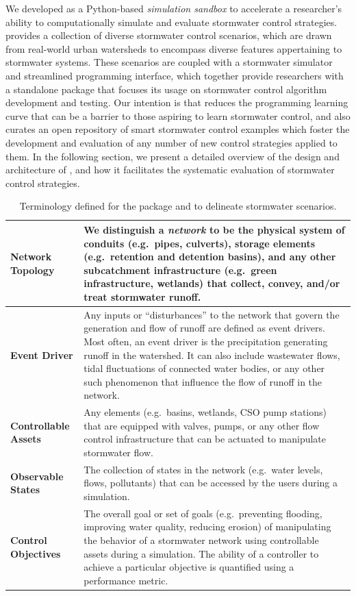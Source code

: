 We developed \pystorms as a Python-based \emph{simulation sandbox} to accelerate a researcher's ability to computationally simulate and evaluate stormwater control strategies. \pystorms provides a collection of diverse stormwater control scenarios, which are drawn from real-world urban watersheds to encompass diverse features appertaining to stormwater systems. These scenarios are coupled with a stormwater simulator and streamlined programming interface, which together provide researchers with a standalone package that focuses its usage on stormwater control algorithm development and testing. Our intention is that \pystorms reduces the programming learning curve that can be a barrier to those aspiring to learn stormwater control, and also curates an open repository of smart stormwater control examples which foster the development and evaluation of any number of new control strategies applied to them. In the following section, we present a detailed overview of the design and architecture of \pystormsNOSPACE, and how it facilitates the systematic evaluation of stormwater control strategies. 
%
%
%
\begin{table}[ht]
\small
\caption{Terminology defined for the \pystorms package and to delineate stormwater scenarios.}\label{tab:terminology}
\begin{tabular}{l p{3.5in}}
\toprule
\textbf{Network Topology} & We distinguish a \emph{network} to be the physical system of conduits (e.g.\ pipes, culverts), storage elements (e.g.\ retention and detention basins), and any other subcatchment infrastructure (e.g.\ green infrastructure, wetlands) that collect, convey, and/or treat stormwater runoff. \\\midrule
\textbf{Event Driver} & Any inputs or ``disturbances'' to the network that govern the generation and flow of runoff are defined as event drivers.
Most often, an event driver is the precipitation generating runoff in the watershed.
It can also include wastewater flows, tidal fluctuations of connected water bodies, or any other such phenomenon that influence the flow of runoff in the network. \\\midrule
\textbf{Controllable Assets} & Any elements (e.g.\ basins, wetlands, CSO pump stations) that are equipped with valves, pumps, or any other flow control infrastructure that can be actuated to manipulate stormwater flow. \\\midrule
\textbf{Observable States} & The collection of states in the network (e.g.\ water levels, flows, pollutants) that can be accessed by the users during a simulation. \\\midrule
\textbf{Control Objectives} & The overall goal or set of goals (e.g.\ preventing flooding, improving water quality, reducing erosion) of manipulating the behavior of a stormwater network using controllable assets during a simulation.
The ability of a controller to achieve a particular objective is quantified using a performance metric. \\
\bottomrule
\end{tabular}
\end{table}
%
%
%
%
%
%
%
%
%
%
%
%
%
%
%
